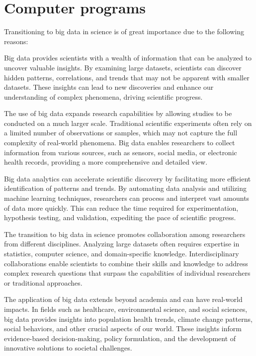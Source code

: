 \newpage
\section{Computer programs}


Transitioning to big data in science is of great importance due to the following reasons:

\parencite{WangIEEE2016, Alizada2017, Wang2018, Khaleghi2019, Wang2021}

Big data provides scientists with a wealth of information that can be analyzed to uncover valuable insights.
By examining large datasets, scientists can discover hidden patterns, correlations, and trends that may not be apparent with smaller datasets.
These insights can lead to new discoveries and enhance our understanding of complex phenomena, driving scientific progress.

The use of big data expands research capabilities by allowing studies to be conducted on a much larger scale.
Traditional scientific experiments often rely on a limited number of observations or samples, which may not capture the full complexity of real-world phenomena.
Big data enables researchers to collect information from various sources, such as sensors, social media, or electronic health records, providing a more comprehensive and detailed view.

Big data analytics can accelerate scientific discovery by facilitating more efficient identification of patterns and trends.
By automating data analysis and utilizing machine learning techniques, researchers can process and interpret vast amounts of data more quickly.
This can reduce the time required for experimentation, hypothesis testing, and validation, expediting the pace of scientific progress.

The transition to big data in science promotes collaboration among researchers from different disciplines.
Analyzing large datasets often requires expertise in statistics, computer science, and domain-specific knowledge.
Interdisciplinary collaborations enable scientists to combine their skills and knowledge to address complex research questions that surpass the capabilities of individual researchers or traditional approaches.

The application of big data extends beyond academia and can have real-world impacts. In fields such as healthcare, environmental science, and social sciences, big data provides insights into population health trends, climate change patterns, social behaviors, and other crucial aspects of our world.
These insights inform evidence-based decision-making, policy formulation, and the development of innovative solutions to societal challenges.

